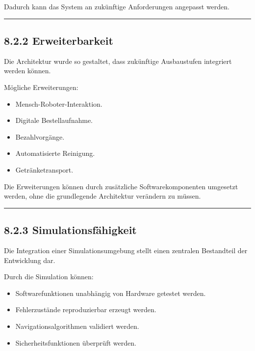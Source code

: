 \documentclass[
  a4paper,
  12pt,
  DIV=12,        %
  parskip=half,  %
  headings=small %
]{scrartcl}
\theoremstyle{definition}
\providecommand{\tightlist}{%
  \setlength{\itemsep}{0pt}\setlength{\parskip}{0pt}}
\theoremstyle{definition}
\providecommand{\tightlist}{%
  \setlength{\itemsep}{0pt}\setlength{\parskip}{0pt}}
\begin{document}
Dadurch kann das System an zukünftige Anforderungen angepasst werden.

\begin{center}\rule{0.5\linewidth}{0.5pt}\end{center}

\subsection{8.2.2 Erweiterbarkeit}\label{erweiterbarkeit}

Die Architektur wurde so gestaltet, dass zukünftige Ausbaustufen
integriert werden können.

Mögliche Erweiterungen:

\begin{itemize}
\tightlist
\item
  Mensch-Roboter-Interaktion.
\item
  Digitale Bestellaufnahme.
\item
  Bezahlvorgänge.
\item
  Automatisierte Reinigung.
\item
  Getränketransport.
\end{itemize}

Die Erweiterungen können durch zusätzliche Softwarekomponenten umgesetzt
werden, ohne die grundlegende Architektur verändern zu müssen.

\begin{center}\rule{0.5\linewidth}{0.5pt}\end{center}

\subsection{8.2.3 Simulationsfähigkeit}\label{simulationsfuxe4higkeit}

Die Integration einer Simulationsumgebung stellt einen zentralen
Bestandteil der Entwicklung dar.

Durch die Simulation können:

\begin{itemize}
\tightlist
\item
  Softwarefunktionen unabhängig von Hardware getestet werden.
\item
  Fehlerzustände reproduzierbar erzeugt werden.
\item
  Navigationsalgorithmen validiert werden.
\item
  Sicherheitsfunktionen überprüft werden.
\end{itemize}
\end{document}
